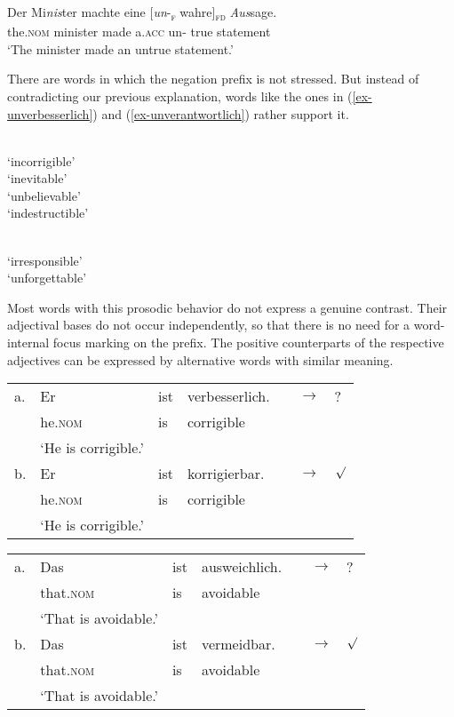 \documentclass[output=paper
  ,nobabel
  ,draftmode
  ,colorlinks, citecolor=brown
]{langscibook}
\begin{document}
\ea\label{ex-untrue}
\gll Der              Mi\emph{nis}ter machte eine           {}[\emph{un}-\textsubscript{\textsc{f}} wahre]\textsubscript{\textsc{fd}} \emph{Aus}sage.\\ 
     the.\textsc{nom} minister made   a.\textsc{acc} \spacebr{}un-           true                       statement\\
\glt `The minister made an untrue statement.'
\z

\noindent There are words in which the negation prefix is not stressed. But instead of contradicting our previous explanation, words like the ones in (\ref{ex-unverbesserlich}) and (\ref{ex-unverantwortlich}) rather support it.

\eal\label{ex-unverbesserlich}
\ex{}\\`incorrigible'
\ex{}\\`inevitable'
\ex{}\\`unbelievable'
\ex{}\\`indestructible'
\zl

\eal\label{ex-unverantwortlich}
\ex{}\\`irresponsible'
\ex{}\\`unforgettable'
\zl

\noindent Most words with this prosodic behavior do not express a genuine contrast. Their adjectival bases do not occur independently, so that there is no need for a word-internal focus marking on the prefix. The positive counterparts of the respective adjectives can be expressed by alternative words with similar meaning.

\ea
\begin{tabular}[t]{lllllll}
	a.&Er&ist&verbesserlich.&&$\rightarrow$&?\\
	&he.\textsc{nom}&is&corrigible&&&\\
	&`He is corrigible.'&&&&&\\
	b.&Er&ist&korrigierbar.&&$\rightarrow$&$\surd$\\
	  &he.\textsc{nom}&is&corrigible&&&\\
          &`He is corrigible.'
\end{tabular}
\z
\ea
\begin{tabular}[t]{lllllll}
	a.&Das&ist&ausweichlich.&&$\rightarrow$&?\\
	&that.\textsc{nom}&is&avoidable&&&\\
	& `That is avoidable.'&&&&&\\
	b.&Das&ist&vermeidbar.&&$\rightarrow$&$\surd$\\
	  &that.\textsc{nom}&is&avoidable&&&\\
          & `That is avoidable.'
\end{tabular}
\z
\end{document}
